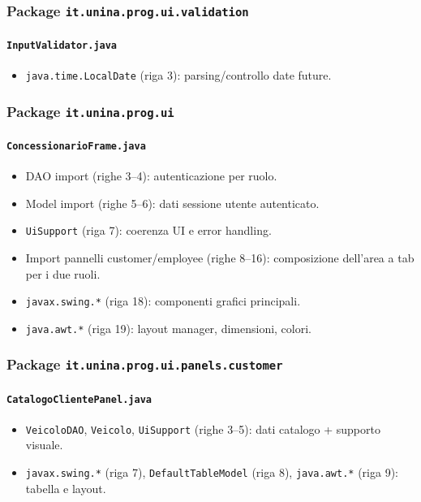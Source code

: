 \documentclass[12pt,a4paper]{article}
\begin{document}
\subsubsection*{Package \texttt{it.unina.prog.ui.validation}}
\paragraph{\texttt{InputValidator.java}}
\begin{itemize}
  \item \texttt{java.time.LocalDate} (riga 3): parsing/controllo date future.
\end{itemize}

\subsubsection*{Package \texttt{it.unina.prog.ui}}
\paragraph{\texttt{ConcessionarioFrame.java}}
\begin{itemize}
  \item DAO import (righe 3--4): autenticazione per ruolo.
  \item Model import (righe 5--6): dati sessione utente autenticato.
  \item \texttt{UiSupport} (riga 7): coerenza UI e error handling.
  \item Import pannelli customer/employee (righe 8--16): composizione dell'area a tab per i due ruoli.
  \item \texttt{javax.swing.*} (riga 18): componenti grafici principali.
  \item \texttt{java.awt.*} (riga 19): layout manager, dimensioni, colori.
\end{itemize}

\subsubsection*{Package \texttt{it.unina.prog.ui.panels.customer}}
\paragraph{\texttt{CatalogoClientePanel.java}}
\begin{itemize}
  \item \texttt{VeicoloDAO}, \texttt{Veicolo}, \texttt{UiSupport} (righe 3--5): dati catalogo + supporto visuale.
  \item \texttt{javax.swing.*} (riga 7), \texttt{DefaultTableModel} (riga 8), \texttt{java.awt.*} (riga 9): tabella e layout.
\end{itemize}
\end{document}
